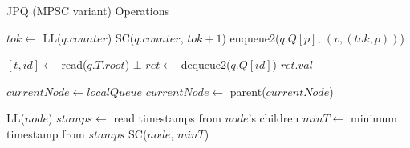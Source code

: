 \begin{algorithm}[!ht]
    \centering
    \captionsetup{justification=centering}
    \caption{\ac{JPQ} (\ac{MPSC} variant) Operations \cite{JayantiLog}}
    \label{alg:jayanti-mpsc}
    \scriptsize
    \begin{algorithmic}[1]
            \State $tok \gets$ LL($q.counter$) 
            \State SC($q.counter$, $tok + 1$) 
            \State enqueue2($q.Q[p]$, $(v, (tok, p))$) 
            \State {}
        \EndFunction
        
        \State
        
            \State $[t, id] \gets$ read($q.T.root$) 
                \State \Return $\bot$
            \EndIf
            \State $ret \gets$ dequeue2($q.Q[id]$)
            \State {}
            \State \Return $ret.val$
        \EndFunction
        
        \State
        
            \State $currentNode \gets localQueue$
            \Repeat
                \State $currentNode \gets$ parent($currentNode$)
                 
                    \State {} 
                \EndIf
        \EndFunction
        
        \State
        
            \State LL($node$) 
            \State $stamps \gets$ read timestamps from $node$'s children
            \State $minT \gets$ minimum timestamp from $stamps$
            \State \Return SC($node$, $minT$) 
        \EndFunction
    \end{algorithmic}
\end{algorithm}

